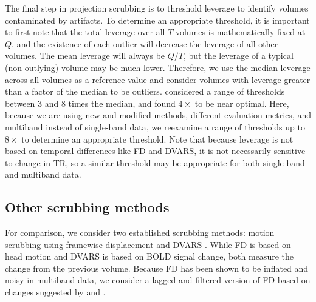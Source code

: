 \documentclass{article}
\begin{document}
The final step in projection scrubbing is to threshold leverage to identify volumes contaminated by artifacts.  To determine an appropriate threshold, it is important to first note that the total leverage over all $T$ volumes is mathematically fixed at $Q$, and the existence of each outlier will decrease the leverage of all other volumes. The mean leverage will always be $Q/T$, but the leverage of a typical (non-outlying) volume may be much lower.  Therefore, we use the median leverage across all volumes as a reference value and consider volumes with leverage greater than a factor of the median to be outliers. \cite{mejiaPCALeverageOutlier2017} considered a range of thresholds between $3$ and $8$ times the median, and found $4\times$ to be near optimal. Here, because we are using new and modified methods, different evaluation metrics, and multiband instead of single-band data, we reexamine a range of thresholds up to $8\times$ to determine an appropriate threshold. Note that because leverage is not based on temporal differences like FD and DVARS, it is not necessarily sensitive to change in TR, so a similar threshold may be appropriate for both single-band and multiband data.

\subsection{Other scrubbing methods}\label{sec:other_scrubbing}

For comparison, we consider two established scrubbing methods: motion scrubbing using framewise displacement \citep[FD,][]{powerSpuriousSystematicCorrelations2012, powerMethodsDetectCharacterize2014} and DVARS \citep{smyserLongitudinalAnalysisNeural2010, afyouniInsightInferenceDVARS2018}. While FD is based on head motion and DVARS is based on BOLD signal change, both measure the change from the previous volume. Because FD has been shown to be inflated and noisy in multiband data, we consider a lagged and filtered version of FD based on changes suggested by \cite{power2019distinctions} and \cite{fairCorrectionRespiratoryArtifacts2020}.
\end{document}

